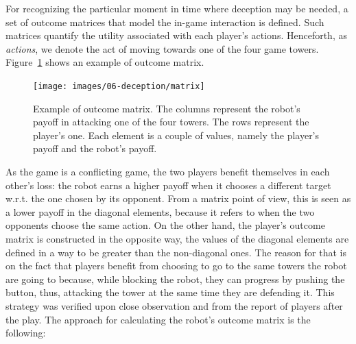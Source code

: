 For recognizing the particular moment in time where deception may be needed, a set of outcome matrices that model the in-game interaction is defined. Such matrices quantify the utility associated with each player's actions. Henceforth, as \textit{actions}, we denote the act of moving towards one of the four game towers. Figure~\ref{fig:matrix} shows an example of outcome matrix.

\begin{figure}[h]
    \centering
    \texttt{[image: images/06-deception/matrix]}
    \caption{Example of outcome matrix. The columns represent the  robot's payoff in attacking one of the four towers. The rows represent the player's one. Each element is a couple of values, namely the player's payoff and the robot's payoff.}
    \label{fig:matrix}
\end{figure}

As the game is a conflicting game, the two players benefit themselves in each other's loss: the robot earns a higher payoff when it chooses a different target w.r.t. the one chosen by its opponent. From a matrix point of view, this is seen as a lower payoff in the diagonal elements, because it refers to when the two opponents choose the same action. On the other hand, the player's outcome matrix is constructed in the opposite way, \ie the values of the diagonal elements are defined in a way to be greater than the non-diagonal ones. The reason for that is on the fact that players benefit from choosing to go to the same towers the robot are going to because, while blocking the robot, they can progress by pushing the button, thus, attacking the tower at the same time they are defending it. This strategy was verified upon close observation and from the report of players after the play. The approach for calculating the robot's outcome matrix is the following:


